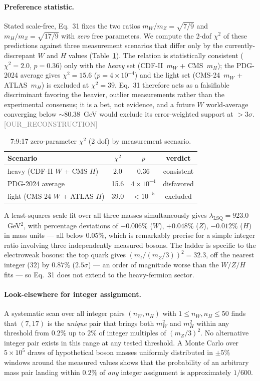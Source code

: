 \documentclass[twocolumn,prd,amsmath,amssymb,floatfix]{revtex4-2}
\newcommand{\reconstruction}{\textcolor{gray}{\small[OUR\_RECONSTRUCTION]}}
\begin{document}
\paragraph{Preference statistic.}
Stated scale-free, Eq.~31 fixes the two ratios $m_W/m_Z=\sqrt{7/9}$ and
$m_H/m_Z=\sqrt{17/9}$ with \emph{zero} free parameters. We compute the 2-dof
$\chi^2$ of these predictions against three measurement scenarios that differ
only by the currently-discrepant $W$ and $H$ values
(Table~\ref{tab:c6pref}). The relation is statistically consistent
($\chi^2=2.0$, $p=0.36$) only with the \emph{heavy} set
(CDF-II~$m_W$ + CMS~$m_H$); the PDG-2024 average gives $\chi^2=15.6$
($p=4\times10^{-4}$) and the light set (CMS-24~$m_W$ + ATLAS~$m_H$) is excluded
at $\chi^2=39$. Eq.~31 therefore acts as a falsifiable discriminant favoring the
heavier, outlier measurements rather than the experimental consensus; it is a
bet, not evidence, and a future $W$ world-average converging below
$\sim 80.38$~GeV would exclude its error-weighted support at $>3\sigma$.
\reconstruction

\begin{table}[h]
\centering
\caption{7:9:17 zero-parameter $\chi^2$ (2 dof) by measurement scenario.}
\label{tab:c6pref}
\begin{tabular}{lccc}
\hline
Scenario & $\chi^2$ & $p$ & verdict \\
\hline
heavy (CDF-II $W$ + CMS $H$) & 2.0 & 0.36 & consistent \\
PDG-2024 average & 15.6 & $4\times10^{-4}$ & disfavored \\
light (CMS-24 $W$ + ATLAS $H$) & 39.0 & $<10^{-5}$ & excluded \\
\hline
\end{tabular}
\end{table}

A least-squares scale fit over all three masses simultaneously gives
$\lambda_\mathrm{LSQ} = 923.0$~GeV$^2$, with percentage deviations of
$-0.006\%$ ($W$), $+0.048\%$ ($Z$), $-0.012\%$ ($H$) in mass units ---
all below $0.05\%$, which is remarkably precise for a simple integer ratio
involving three independently measured bosons.
The ladder is specific to the electroweak bosons: the top quark gives
$(m_t/(m_Z/3))^2 = 32.3$, off the nearest integer ($32$) by $0.87\%$
($2.5\sigma$) --- an order of magnitude worse than the $W/Z/H$ fits --- so
Eq.~31 does not extend to the heavy-fermion sector.

\paragraph{Look-elsewhere for integer assignment.}
A systematic scan over all integer pairs $(n_W, n_H)$ with $1 \le n_W, n_H \le 50$
finds that $(7, 17)$ is the \emph{unique} pair that brings both $m_W^2$ and $m_H^2$
within any threshold from $0.2\%$ up to $2\%$ of integer multiples of $(m_Z/3)^2$.
No alternative integer pair exists in this range at any tested threshold.
A Monte Carlo over $5 \times 10^5$ draws of hypothetical boson masses uniformly
distributed in $\pm5\%$ windows around the measured values shows that the probability
of an arbitrary mass pair landing within $0.2\%$ of \emph{any} integer assignment
is approximately $1/600$.
\end{document}
